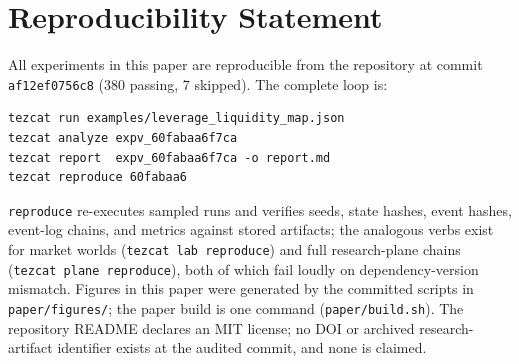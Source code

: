 \documentclass[conference]{IEEEtran}
\begin{document}
\section*{Reproducibility Statement}
All experiments in this paper are reproducible from the repository at
commit \texttt{af12ef0756c8} (380 passing, 7 skipped). The complete
loop is:
{\footnotesize\begin{verbatim}
tezcat run examples/leverage_liquidity_map.json
tezcat analyze expv_60fabaa6f7ca
tezcat report  expv_60fabaa6f7ca -o report.md
tezcat reproduce 60fabaa6
\end{verbatim}}
\texttt{reproduce} re-executes sampled runs and verifies seeds, state
hashes, event hashes, event-log chains, and metrics against stored
artifacts; the analogous verbs exist for market worlds
(\texttt{tezcat lab reproduce}) and full research-plane chains
(\texttt{tezcat plane reproduce}), both of which fail loudly on
dependency-version mismatch. Figures in this paper were generated by
the committed scripts in \texttt{paper/figures/}; the paper build is
one command (\texttt{paper/build.sh}). The repository README declares
an MIT license; no DOI or archived research-artifact identifier exists
at the audited commit, and none is claimed.

\balance


\end{document}
